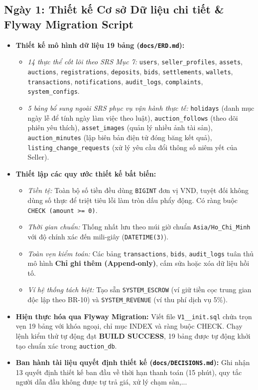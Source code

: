 \documentclass[a4paper]{article}
\begin{document}
\subsection{Ngày 1: Thiết kế Cơ sở Dữ liệu chi tiết \& Flyway Migration Script}
\begin{itemize}
    \item \textbf{Thiết kế mô hình dữ liệu 19 bảng (\texttt{docs/ERD.md}):}
    \begin{itemize}
        \item \textit{14 thực thể cốt lõi theo SRS Mục 7:} \texttt{users}, \texttt{seller\_profiles}, \texttt{assets}, \texttt{auctions}, \texttt{registrations}, \texttt{deposits}, \texttt{bids}, \texttt{settlements}, \texttt{wallets}, \texttt{transactions}, \texttt{notifications}, \texttt{audit\_logs}, \texttt{complaints}, \texttt{system\_configs}.
        \item \textit{5 bảng bổ sung ngoài SRS phục vụ vận hành thực tế:} \texttt{holidays} (danh mục ngày lễ để tính ngày làm việc theo luật), \texttt{auction\_follows} (theo dõi phiên yêu thích), \texttt{asset\_images} (quản lý nhiều ảnh tài sản), \texttt{auction\_minutes} (lập biên bản điện tử đóng băng kết quả), \texttt{listing\_change\_requests} (xử lý yêu cầu đổi thông số niêm yết của Seller).
    \end{itemize}
    \item \textbf{Thiết lập các quy ước thiết kế bất biến:}
    \begin{itemize}
        \item \textit{Tiền tệ:} Toàn bộ số tiền đều dùng \texttt{BIGINT} đơn vị VND, tuyệt đối không dùng số thực để triệt tiêu lỗi làm tròn dấu phẩy động. Có ràng buộc \texttt{CHECK (amount >= 0)}.
        \item \textit{Thời gian chuẩn:} Thống nhất lưu theo múi giờ chuẩn \texttt{Asia/Ho\_Chi\_Minh} với độ chính xác đến mili-giây (\texttt{DATETIME(3)}).
        \item \textit{Toàn vẹn kiểm toán:} Các bảng \texttt{transactions}, \texttt{bids}, \texttt{audit\_logs} tuân thủ mô hình \textbf{Chỉ ghi thêm (Append-only)}, cấm sửa hoặc xóa dữ liệu hồi tố.
        \item \textit{Ví hệ thống tách biệt:} Tạo sẵn \texttt{SYSTEM\_ESCROW} (ví giữ tiền cọc trung gian độc lập theo BR-10) và \texttt{SYSTEM\_REVENUE} (ví thu phí dịch vụ 5\%).
    \end{itemize}
    \item \textbf{Hiện thực hóa qua Flyway Migration:} Viết file \texttt{V1\_\_init.sql} chứa trọn vẹn 19 bảng với khóa ngoại, chỉ mục INDEX và ràng buộc CHECK. Chạy lệnh kiểm thử tự động đạt \textbf{BUILD SUCCESS}, 19 bảng được tự động khởi tạo chuẩn xác trong \texttt{auction\_db}.
    \item \textbf{Ban hành tài liệu quyết định thiết kế (\texttt{docs/DECISIONS.md}):} Ghi nhận 13 quyết định thiết kế ban đầu về thời hạn thanh toán (15 phút), quy tắc người dẫn đầu không được tự trả giá, xử lý chạm sàn,...
\end{itemize}
\end{document}
